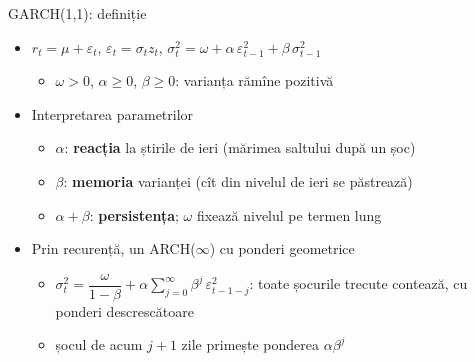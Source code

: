 \begin{frame}{GARCH(1,1): definiție}
\itemsize{\small}
\begin{itemize}
    \item $r_t = \mu + \varepsilon_t$, \quad $\varepsilon_t = \sigma_t z_t$, \quad $\sigma_t^2 = \omega + \alpha\,\varepsilon_{t-1}^2 + \beta\,\sigma_{t-1}^2$
    \begin{itemize}
        \item $\omega > 0$, $\alpha \ge 0$, $\beta \ge 0$: varianța rămîne pozitivă
    \end{itemize}
    \item Interpretarea parametrilor
    \begin{itemize}
        \item $\alpha$: \textbf{reacția} la știrile de ieri (mărimea saltului după un șoc)
        \item $\beta$: \textbf{memoria} varianței (cît din nivelul de ieri se păstrează)
        \item $\alpha + \beta$: \textbf{persistența}; $\omega$ fixează nivelul pe termen lung
    \end{itemize}
    \item Prin recurență, un ARCH($\infty$) cu ponderi geometrice
    \begin{itemize}
        \item $\sigma_t^2 = \dfrac{\omega}{1 - \beta} + \alpha\sum_{j=0}^{\infty}\beta^j\,\varepsilon_{t-1-j}^2$: toate șocurile trecute contează, cu ponderi descrescătoare
        \item șocul de acum $j + 1$ zile primește ponderea $\alpha\beta^j$
    \end{itemize}
\end{itemize}
\end{frame}

